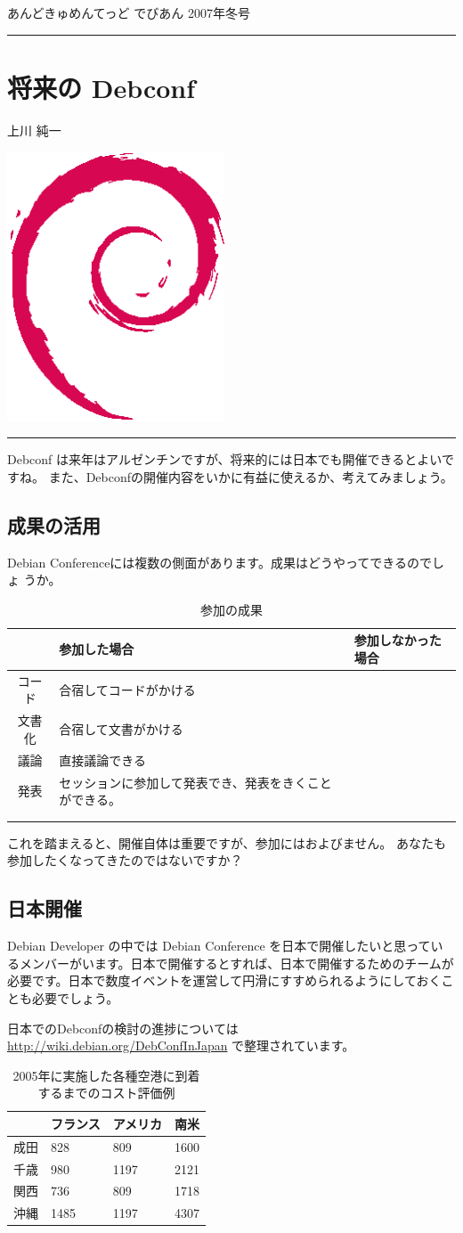 \documentclass[mingoth,a4paper]{jsarticle}
\renewcommand{\dancersection}[2]{%
\newpage
あんどきゅめんてっど でびあん 2007年冬号
%
\vspace{0.1mm}\\
{\color{dancerlightblue}\rule{\hsize}{2mm}}

%
%
\begin{minipage}[t]{0.7\hsize}
\color{dancerdarkblue}
\vspace{1cm}
\section{#1}
\hfill{}#2\\
\end{minipage}
\begin{minipage}[t]{0.3\hsize}
\vspace{-2cm}
\hfill{}\includegraphics[height=8cm]{image200502/openlogo-nd.eps}\\
\vspace{-5cm}
\end{minipage}
%
%
{\color{dancerdarkblue}\rule{0.74\hsize}{2mm}}
%
\vspace{2cm}
}
\begin{document}
\dancersection{将来の Debconf }{上川 純一}
\label{sec:debconfplanning}


Debconf は来年はアルゼンチンですが、将来的には日本でも開催できるとよいで
すね。
また、Debconfの開催内容をいかに有益に使えるか、考えてみましょう。


\subsection{成果の活用}

Debian Conferenceには複数の側面があります。成果はどうやってできるのでしょ
うか。

\begin{table}[H]
\caption{参加の成果}
\label{tab:framework}
\begin{center}
{\LARGE
  \begin{tabularx}{\hsize}{|c|X|X|}
 \hline
 & 参加した場合 & 参加しなかった場合 \\
 \hline
 コード	& 合宿してコードがかける &  \\
 \hline
 文書化	& 合宿して文書がかける&  \\
 \hline
 議論 	& 直接議論できる &  \\
 \hline
 発表 	& セッションに参加して発表でき、発表をきくことができる。 &  \\
 \hline
&&\\
 \hline
&&\\
 \hline
 \end{tabularx}
}
\end{center} 
\end{table}

これを踏まえると、開催自体は重要ですが、参加にはおよびません。
あなたも参加したくなってきたのではないですか？

\subsection{日本開催}

Debian Developer の中では Debian Conference を日本で開催したいと思ってい
るメンバーがいます。日本で開催するとすれば、日本で開催するためのチームが
必要です。日本で数度イベントを運営して円滑にすすめられるようにしておくこ
とも必要でしょう。

日本でのDebconfの検討の進捗については
\url{http://wiki.debian.org/DebConfInJapan}
で整理されています。

\begin{table}[H]
\caption{2005年に実施した各種空港に到着するまでのコスト評価例}
\label{tab:framework}
\begin{center}
{\LARGE
  \begin{tabularx}{\hsize}{|c|X|X|X|}
 \hline
 & フランス & アメリカ & 南米 \\
 \hline
成田 & 828 & 809 & 1600 \\
千歳 &980 & 1197 &2121 \\
関西 &736 & 809 &1718 \\
沖縄 &1485 & 1197 &4307 \\
 \hline
 \end{tabularx}
}
\end{center} 
\end{table}
\end{document}
